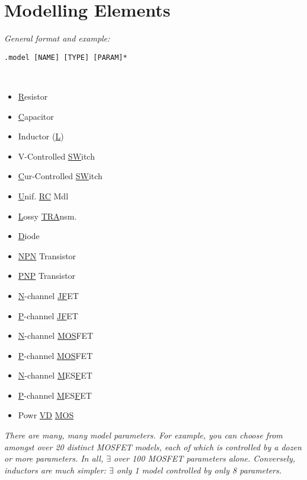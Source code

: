 \section{Modelling Elements}


\textit{General format and example:}\\
\begin{lstlisting}
.model [NAME] [TYPE] [PARAM]*
\end{lstlisting}
  \\


{\footnotesize 
\begin{multicols}{3}\begin{itemize}[leftmargin=0pt,label={}]
    \item \underline{R}esistor
    \item \underline{C}apacitor
    \item Inductor (\underline{L})
    \item V-Controlled \underline{SW}itch
    \item \underline{C}ur-Controlled \underline{SW}itch
    \item \underline{U}nif. \underline{RC} Mdl
    \item \underline{L}ossy \underline{TRA}nsm. 
    \item \underline{D}iode
    \item \underline{NPN} Transistor
    \item \underline{PNP} Transistor
    \item \underline{N}-channel \underline{JF}ET
    \item \underline{P}-channel \underline{JF}ET
    \item \underline{N}-channel \underline{MOS}FET
    \item \underline{P}-channel \underline{MOS}FET
    \item \underline{N}-channel \underline{M}ES\underline{F}ET
    \item \underline{P}-channel \underline{M}ES\underline{F}ET
    \item Powr \underline{VD} \underline{MOS}
\end{itemize}\end{multicols}
}

\textit{There are many, many model parameters. For example, you can choose from amongst over 20 distinct MOSFET models, each of which is controlled by a dozen or more parameters. In all, $\exists$ over 100 MOSFET parameters alone. Conversely, inductors are much simpler: $\exists$ only 1 model controlled by only 8 parameters.}

